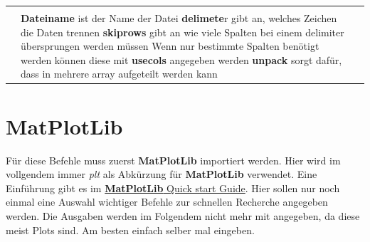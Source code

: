 \documentclass[a4paper,12pt]{article}
\begin{document}
\begin{center}
\begin{tabular}{|p{3cm}|p{8cm}|p{3cm}|}
&&\\
& \textbf{Dateiname} ist der Name der Datei \newline{} \newline{}
\textbf{delimete}r gibt an, welches Zeichen die Daten trennen \newline{} \newline{}
\textbf{skiprows} gibt an wie viele Spalten bei einem delimiter übersprungen werden müssen \newline{} \newline{}
Wenn nur bestimmte Spalten benötigt werden können diese mit \textbf{usecols} angegeben werden \newline{} \newline{}
\textbf{unpack} sorgt dafür, dass in mehrere array aufgeteilt werden kann
& \\
\hline
\end{tabular}
\end{center}

\section*{MatPlotLib}

Für diese Befehle muss zuerst \textbf{MatPlotLib} importiert werden. Hier wird im vollgendem immer \textit{plt} als Abkürzung für \textbf{MatPlotLib} verwendet. Eine Einführung gibt es im \href{https://matplotlib.org/stable/users/explain/quick_start.html}{\textbf{MatPlotLib} Quick start Guide}. Hier sollen nur noch einmal eine Auswahl wichtiger Befehle zur schnellen Recherche angegeben werden.
Die Ausgaben werden im Folgendem nicht mehr mit angegeben, da diese meist Plots sind. Am besten einfach selber mal eingeben.
\end{document}
